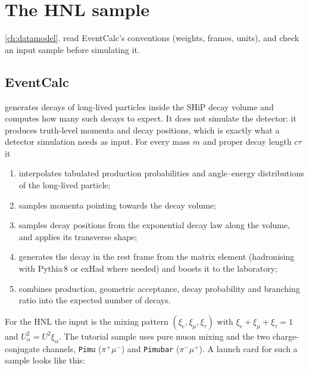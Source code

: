 \chapter{The HNL sample}
\label{ch:generator}

{\cref{ch:datamodel}.}
{read EventCalc's conventions (weights, frames, units), and check an input sample before simulating it.}

\section{EventCalc}

 generates decays of long-lived particles inside the SHiP
decay volume and computes how many such decays to expect. It does not
simulate the detector: it produces truth-level momenta and decay positions,
which is exactly what a detector simulation needs as input. For every mass
$m$ and proper decay length $c\tau$ it

\begin{enumerate}
  \item interpolates tabulated production probabilities and angle--energy
        distributions of the long-lived particle;
  \item samples momenta pointing towards the decay volume;
  \item samples decay positions from the exponential decay law along the
        volume, and applies its transverse shape;
  \item generates the decay in the rest frame from the matrix element
        (hadronising with Pythia\,8 or exHad where needed) and boosts it to the
        laboratory;
  \item combines production, geometric acceptance, decay probability and
        branching ratio into the expected number of decays.
\end{enumerate}

For the HNL the input is the mixing pattern
$(\xi_e, \xi_\mu, \xi_\tau)$ with $\xi_e+\xi_\mu+\xi_\tau=1$ and
$U_\alpha^2 = U^2 \xi_\alpha$. The tutorial sample uses pure muon mixing and
the two charge-conjugate channels, \texttt{Pimu} ($\pi^+\mu^-$) and
\texttt{Pimubar} ($\pi^-\mu^+$). A launch card for such a sample looks like
this:



